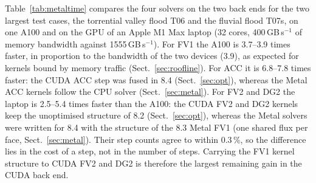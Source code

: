 \documentclass[preprint,12pt,authoryear]{elsarticle}
\begin{document}
Table~\ref{tab:metaltime} compares the four solvers on the two back ends
for the two largest test cases, the torrential valley flood T06 and the
fluvial flood T07s, on one A100 and on the GPU of an Apple M1 Max laptop (32 cores, 400\,GB\,s$^{-1}$ of memory bandwidth against
1555\,GB\,s$^{-1}$). For FV1 the A100 is 3.7--3.9 times faster, in
proportion to the bandwidth of the two devices (3.9), as expected for kernels
bound by memory traffic (Sect.~\ref{sec:roofline}). For ACC it is 6.8--7.8
times faster: the CUDA ACC step was fused in 8.4 (Sect.~\ref{sec:opt}),
whereas the Metal ACC kernels follow the CPU solver (Sect.~\ref{sec:metal}).
For FV2 and DG2 the laptop is
2.5--5.4 times faster than the A100: the CUDA FV2 and DG2 kernels keep the
unoptimised structure of 8.2 (Sect.~\ref{sec:opt}), whereas the Metal
solvers were written for 8.4
with the structure of the 8.3 Metal FV1 (one shared flux per face,
Sect.~\ref{sec:metal}). Their step counts agree to within 0.3\,\%, so the
difference lies in the cost of a step, not in the number of steps. Carrying
the FV1 kernel structure to CUDA FV2 and DG2 is therefore the largest
remaining gain in the CUDA back end.

\begin{table}[t]
\centering\small
\caption{Wall-clock time of the solver process (reading, simulation, writing)
for the same case and solver on one NVIDIA A100 (CUDA) and on an Apple M1
Max (Metal), single precision; time per step in milliseconds; ratio of the M1
Max time to the A100 time. Steps: A100 (M1 Max within 0.3\,\%). T06:
Environment Agency test 5, torrential valley flood, 1.7 million cells, 30\,h.
T07s: Carlisle 2005, fluvial flood, 0.58 million cells, first 6\,h. CUDA ACC
and FV1 are the solvers optimised in 8.4; CUDA FV2 and DG2 keep the
unoptimised kernels of 8.2 (Sect.~\ref{sec:opt}).}
\label{tab:metaltime}
\end{table}
\end{document}
